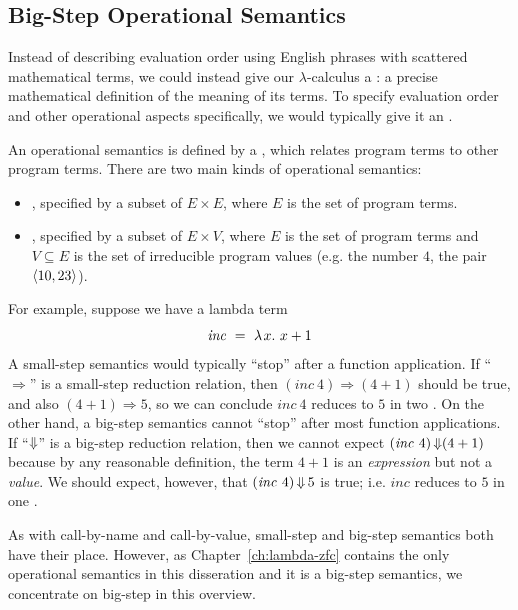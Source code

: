 
\subsection{Big-Step Operational Semantics}

Instead of describing evaluation order using English phrases with scattered mathematical terms, we could instead give our $\lambda$-calculus a : a precise mathematical definition of the meaning of its terms.
To specify evaluation order and other operational aspects specifically, we would typically give it an .

An operational semantics is defined by a , which relates program terms to other program terms.
There are two main kinds of operational semantics:
\begin{itemize}
	\item {}, specified by a subset of $E \times E$, where $E$ is the set of program terms.
	\item {}, specified by a subset of $E \times V$, where $E$ is the set of program terms and $V \subseteq E$ is the set of irreducible program values (e.g. the number $4$, the pair $\langle{10,23}\rangle$).
\end{itemize}
For example, suppose we have a lambda term
\begin{equation}
	\mathit{inc}\ =\ \lambda\mspace{2mu}{x}\ldotp\, x + 1
\end{equation}
A small-step semantics would typically ``stop'' after a function application.
If ``$\Rightarrow$'' is a small-step reduction relation, then $(\mathit{inc}~4) \Rightarrow (4 + 1)$ should be true, and also $(4 + 1) \Rightarrow 5$, so we can conclude $\mathit{inc}~4$ reduces to $5$ in two .
On the other hand, a big-step semantics cannot ``stop'' after most function applications.
If ``$\operatorname{\Downarrow}$'' is a big-step reduction relation, then we cannot expect $(\mathit{inc}~4) \operatorname{\Downarrow} (4 + 1)$ because by any reasonable definition, the term $4 + 1$ is an \emph{expression} but not a \emph{value}.
We should expect, however, that $(\mathit{inc}~4) \operatorname{\Downarrow} 5$ is true; i.e. $\mathit{inc}$ reduces to $5$ in one .

As with call-by-name and call-by-value, small-step and big-step semantics both have their place.
However, as Chapter~\ref{ch:lambda-zfc} contains the only operational semantics in this disseration and it is a big-step semantics, we concentrate on big-step in this overview.

